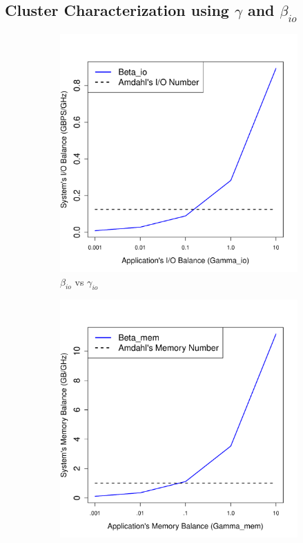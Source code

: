 \documentclass[journal]{IEEEtran}
\begin{document}
\subsection{Cluster Characterization using $\gamma$ and $\beta_{io}$}
\begin{figure}[htb]
	\begin{subfigure}[b]{0.23\textwidth}
                \includegraphics[width=\textwidth]{Figures/beta_io.pdf}
                \caption{$\beta_{io}$ vs  $\gamma_{io}$}
                \label{fig:beta_io}
    \end{subfigure}
 	\begin{subfigure}[b]{0.23\textwidth}
                \includegraphics[width=\textwidth]{Figures/beta_mem.pdf}

\end{subfigure}
\end{figure}
\end{document}
